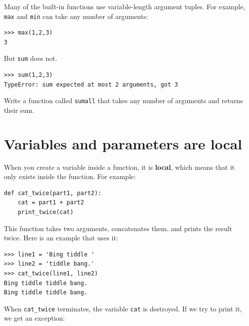 \begin{ex}
Many of the built-in functions use
variable-length argument tuples.  For example, {\tt max}
and {\tt min} can take any number of arguments:


\beforeverb
\begin{verbatim}
>>> max(1,2,3)
3
\end{verbatim}
\afterverb
%
But {\tt sum} does not.


\beforeverb
\begin{verbatim}
>>> sum(1,2,3)
TypeError: sum expected at most 2 arguments, got 3
\end{verbatim}
\afterverb
%
Write a function called {\tt sumall} that takes any number
of arguments and returns their sum.

\end{ex}



\section{Variables and parameters are local}

When you create a variable inside a function, it is {\bf local},
which means that it only
exists inside the function.  For example:


\beforeverb
\begin{verbatim}
def cat_twice(part1, part2):
    cat = part1 + part2
    print_twice(cat)
\end{verbatim}
\afterverb
%
This function takes two arguments, concatenates them, and prints
the result twice.  Here is an example that uses it:


\beforeverb
\begin{verbatim}
>>> line1 = 'Bing tiddle '
>>> line2 = 'tiddle bang.'
>>> cat_twice(line1, line2)
Bing tiddle tiddle bang.
Bing tiddle tiddle bang.
\end{verbatim}
\afterverb
%
When \verb"cat_twice" terminates, the variable {\tt cat}
is destroyed.  If we try to print it, we get an exception:


